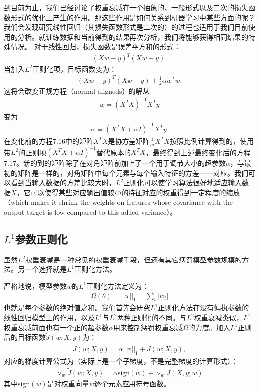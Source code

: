 到目前为止，我们已经讨论了权重衰减在一个抽象的、一般形式以及二次的损失函数形式的优化上产生的作用。那这些作用是如何关系到机器学习中某些方面的呢？我们会发现研究线性回归（其损失函数形式是二次的）的过程也适用于我们目前使用的分析。就训练数据和当前得到的结果再次分析，我们将能够获得相同结果的特殊情况。 对于线性回归，损失函数是误差平方和的形式：
$$
\begin{aligned}
(Xw - y)^T (Xw - y).
\end{aligned}
$$
当加入$L^2$正则化项，目标函数变为：
$$
\begin{aligned}
	(Xw - y)^T (Xw - y) + \frac{1}{2} \alpha w^T w.
\end{aligned}
$$
这将会改变正规方程（normal aligneds）的解从
$$
\begin{aligned}
	w = (X^TX)^{-1}X^T y
\end{aligned}
$$
变为
$$
\begin{aligned}
	w =  (X^TX + \alpha I)^{-1}X^T y.
\end{aligned}
$$
在变化前的方程7.16中的矩阵$X^TX$是协方差矩阵$\frac{1}{m} X^T X$按照比例计算得到的，使用带$L^2$的正则项$(X^TX +\alpha I)^{-1}$替代原本的$X^TX$，最终得到上述最终变化后的方程7.17。新的到的矩阵除了在对角矩阵前加上了一个用于调节大小的超参数$\alpha$，与最初的矩阵是一样的，对角矩阵中每个元素与每个输入特征的方差一一对应。我们可以看到当输入数据的方差比较大时，$L^2$正则化可以使学习算法很好地适应输入数据$X$，它可以使得某些对应输出值较小的特征对应的权重得到一定程度的缩放（which makes it shrink the weights on features whose covariance with the output target is low compared to this added variance）。

\subsection{$L^1$参数正则化}

虽然$L^2$权重衰减是一种常见的权重衰减手段，但还有其它惩罚模型参数规模的方法。另一个选择就是$L^1$正则化方法。

严格地说，模型参数$w$的$L^1$正则化方法定义为：
$$
\begin{aligned}
	\Omega(\theta) = ||w||_1 = \sum_i |w_i|
\end{aligned}
$$
也就是每个参数的绝对值之和。我们首先会研究$L^1$正则化方法在没有偏执参数的线性回归模型上的作用，以及$L^1$与$L^2$两种正则化的不同。与$L^2$权重衰减类似，$L^1$权重衰减前面也有一个正的超参数$\alpha$用来控制惩罚权重衰减$\Omega$的力度。加入$L^1$正则后的目标函数$\widetilde{J} (w; X, y) $为：
$$
\begin{aligned}
	\widetilde{J} (w; X, y) = \alpha ||w||_1 + J(w;X,y),
\end{aligned}
$$
对应的梯度计算公式为（实际上是一个子梯度，不是完整梯度的计算形式）：
$$
\begin{aligned}
\triangledown_w \widetilde{J} (w; X, y) = \alpha \text{sign} (w) + \triangledown_w J(X,y;w)
\end{aligned}
$$
其中$\text{sign}(w)$是对权重向量$w$逐个元素应用符号函数。


